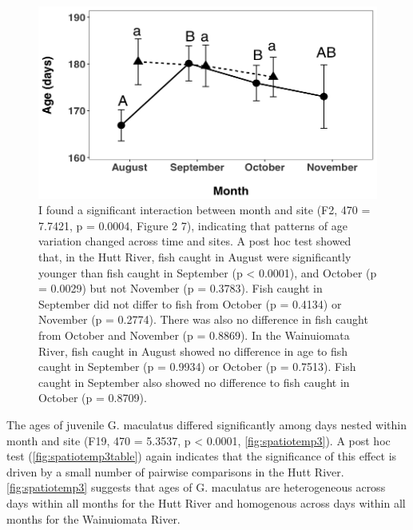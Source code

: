 \documentclass[]{book}
\begin{document}
\begin{figure}
\centering
\includegraphics{images/spatiotemporalage.png}
\caption{\label{fig:spatiotemporalage}I found a significant interaction
between month and site (F2, 470 = 7.7421, p = 0.0004, Figure 2 7),
indicating that patterns of age variation changed across time and sites.
A post hoc test showed that, in the Hutt River, fish caught in August
were significantly younger than fish caught in September (p \textless{}
0.0001), and October (p = 0.0029) but not November (p = 0.3783). Fish
caught in September did not differ to fish from October (p = 0.4134) or
November (p = 0.2774). There was also no difference in fish caught from
October and November (p = 0.8869). In the Wainuiomata River, fish caught
in August showed no difference in age to fish caught in September (p =
0.9934) or October (p = 0.7513). Fish caught in September also showed no
difference to fish caught in October (p = 0.8709).}
\end{figure}

The ages of juvenile G. maculatus differed significantly among days
nested within month and site (F19, 470 = 5.3537, p \textless{} 0.0001,
\ref{fig:spatiotemp3}). A post hoc test (\ref{fig:spatiotemp3table})
again indicates that the significance of this effect is driven by a
small number of pairwise comparisons in the Hutt River.
\ref{fig:spatiotemp3} suggests that ages of G. maculatus are
heterogeneous across days within all months for the Hutt River and
homogenous across days within all months for the Wainuiomata River.
\end{document}
